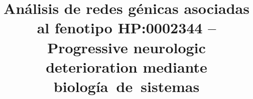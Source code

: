 \documentclass{bmcart}
\begin{document}
	\begin{frontmatter}
	
		\begin{fmbox}
			
			
			\title{Análisis de redes génicas asociadas al fenotipo HP:0002344 – Progressive neurologic deterioration mediante biología de sistemas}
			
			
			\author[
			  addressref={aff1},                   %
			  corref={aff1},                       %
			  email={capi13@uma.es}   %
			]{ } %
			\author[
			  addressref={aff1},
			  email={achrafousti@uma.es}
			]{ }
			\author[
			  addressref={aff1},
		 	  email={aissaomar@uma.es}
			]{ }
			\author[
			  addressref={aff1},
			  email={hugosalascalderon@uma.es}
			]{ }
			
			
			
			
			
			\address[id=aff1]{%
			  ,             %
			  ,          %
			  ,                              %
			}
		
		\end{fmbox}%
		
		\begin{abstractbox}
		
			\begin{abstract} %
			

\end{abstract}
\end{abstractbox}
\end{frontmatter}
\end{document}
